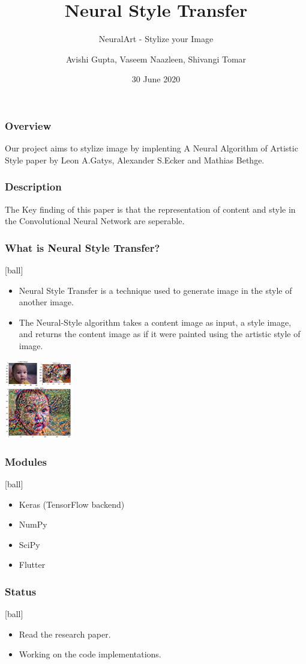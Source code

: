 \documentclass[14pt]{beamer}
\title[NST]{Neural Style Transfer}
\subtitle{NeuralArt - Stylize your Image}
\author[Team - 38]{Avishi Gupta, Vaseem Naazleen, Shivangi Tomar}
\date{30 June 2020}
\begin{document}
\begin{frame}
   \titlepage
\end{frame}

\begin{frame}
		\frametitle{Overview}
		Our project aims to stylize image by implenting A Neural Algorithm of Artistic Style paper by Leon A.Gatys, Alexander S.Ecker and Mathias Bethge.
\end{frame}

\begin{frame}
		\frametitle{Description}
		The Key finding of this paper is that the representation of content and style in the Convolutional Neural Network are seperable.
\end{frame}

\begin{frame}
		\frametitle{What is Neural Style Transfer?}
		\begin{itemize}
		\item Neural Style Transfer is a technique used to generate image in the style of another image.
		\item The Neural-Style algorithm takes a content image as input, a style image, and returns the content image as if it were painted using the artistic style of image.
		\end{itemize}
        \begin{center}
		    \includegraphics[width=30mm]{image.jpg}
        \end{center}
\end{frame}

\begin{frame}
		\frametitle{Modules}
		\begin{itemize}
		\item Keras (TensorFlow backend)
		\item NumPy
		\item SciPy
		\item Flutter
		\end{itemize}
\end{frame}

\begin{frame}
		\frametitle{Status}
		\begin{itemize}
		\item Read the research paper.
		\item Working on the code implementations.
		\end{itemize}
\end{frame}
\end{document}
